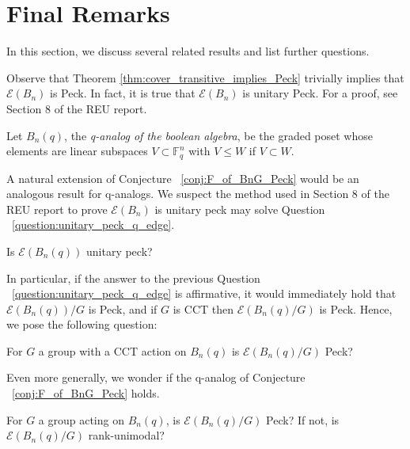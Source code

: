 \documentclass[smallextended, envcountsame, numbook]{svjour3}
\numberwithin{equation}{section}
\begin{document}
\section{Final Remarks}

In this section, we discuss several related results and list further questions. 

\begin{remark}
Observe that Theorem \ref{thm:cover_transitive_implies_Peck} trivially implies that $\mathcal E(B_n)$ is Peck. In fact, it is true that $\mathcal E(B_n)$ is unitary Peck. For a proof, see Section 8 of the REU report.
\end{remark}

\begin{definition}
Let $B_n(q)$, the {\it q-analog of the boolean algebra}, be the graded poset whose elements are linear subspaces $V \subset \mathbb F_q^n$ with $V \leq W$ if $V \subset W$.
\end{definition}

A natural extension of Conjecture ~\ref{conj:F_of_BnG_Peck} would be an analogous result for q-analogs. We suspect the method used in Section 8 of the REU report to prove $\mathcal E(B_n)$ is unitary peck may solve Question ~\ref{question:unitary_peck_q_edge}.

\begin{question}
\label{question:unitary_peck_q_edge}
Is $\mathcal E(B_n(q))$ unitary peck?
\end{question}


In particular, if the answer to the previous Question ~\ref{question:unitary_peck_q_edge} is affirmative, it would immediately hold that $\mathcal E(B_n(q))/G$ is Peck, and if $G$ is CCT then $\mathcal E(B_n(q)/G)$ is Peck. Hence, we pose the following question: 

\begin{question}
For $G$ a group with a CCT action on $B_n(q)$ is $\mathcal E(B_n(q)/G)$ Peck?
\end{question}

Even more generally, we wonder if the q-analog of Conjecture ~\ref{conj:F_of_BnG_Peck} holds.

\begin{question}
For $G$ a group acting on $B_n(q)$, is $\mathcal E(B_n(q)/G)$ Peck? If not, is $\mathcal E(B_n(q)/G)$ rank-unimodal?
\end{question}
\end{document}

